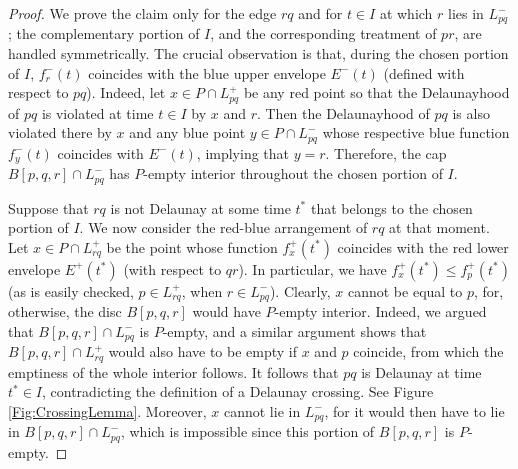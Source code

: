 \documentclass[letter,11pt]{article}
\def \L{{L}}
\begin{document}
\begin{proof}
We prove the claim only for the edge $rq$ and for $t\in I$ at which $r$ lies in $\L_{pq}^-$; the complementary portion of $I$, and the corresponding treatment of $pr$, are handled symmetrically. The crucial observation is that, during the chosen portion of $I$, $f_r^-(t)$ coincides with the blue upper envelope $E^-(t)$ (defined with respect to $pq$). Indeed, let $x\in P\cap \L_{pq}^+$ be any red point so that the Delaunayhood of $pq$ is violated at time $t\in I$ by $x$ and $r$. Then the Delaunayhood of $pq$ is also violated there by $x$ and any blue point $y\in P\cap \L_{pq}^-$ whose respective blue function $f_y^-(t)$ coincides with $E^-(t)$, implying that $y=r$.
Therefore, the cap $B[p,q,r]\cap \L_{pq}^-$ has $P$-empty interior throughout the chosen portion of $I$. 

Suppose that $rq$ is not Delaunay at some time $t^*$ that belongs to the chosen portion of $I$.
We now consider the red-blue arrangement of $rq$ at that moment. Let $x\in P\cap \L_{rq}^+$ be the point whose function $f_x^+(t^*)$ coincides with the red lower envelope $E^+(t^*)$ (with respect to $qr$). In particular, we have $f^+_x(t^*)\leq f^+_p(t^*)$ (as is easily checked, $p\in \L_{rq}^+$, when $r\in \L_{pq}^-$). Clearly, $x$ cannot be equal to $p$, for, otherwise, the disc $B[p,q,r]$ would have $P$-empty interior. Indeed, we argued that $B[p,q,r]\cap \L_{pq}^-$ is $P$-empty, and a similar argument shows that $B[p,q,r]\cap \L_{rq}^+$ would also have to be empty if $x$ and $p$ coincide, from which the emptiness of the whole interior follows. It follows that $pq$ is Delaunay at time $t^*\in I$,
contradicting the definition of a Delaunay crossing. See Figure \ref{Fig:CrossingLemma}.
Moreover, $x$ cannot lie in $\L_{pq}^-$, for it would then have to lie in $B[p,q,r]\cap \L_{pq}^-$, which is impossible since this portion of $B[p,q,r]$ is $P$-empty.


\end{proof}
\end{document}
